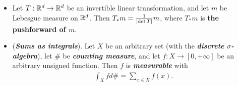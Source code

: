 \documentclass[11pt]{article}
\begin{document}
\begin{itemize}
\item \begin{corollary} 
Let $T : {\mathbb R}^d \rightarrow {\mathbb R}^d$ be an invertible linear transformation, and let $m$ be Lebesgue measure on ${\mathbb R}^d$. Then $T_{*}m =\frac{1}{\left\lvert \det{T} \right\rvert}m$, where $T_{*}m$ is \textbf{the pushforward of $m$}.
\end{corollary}

\item \begin{example} (\emph{\textbf{Sums as integrals}}).
Let $X$ be an arbitrary set (with the \emph{\textbf{discrete $\sigma$-algebra}}), let $\#$ be \emph{\textbf{counting measure}}, and let $f: X \rightarrow [0, +\infty]$ be an arbitrary unsigned function. Then $f$ is \textbf{\emph{measurable}} with
\begin{align*}
\int_X f d\# = \sum_{x \in X} f(x).
\end{align*}
\end{example}
\end{itemize}
\end{document}
